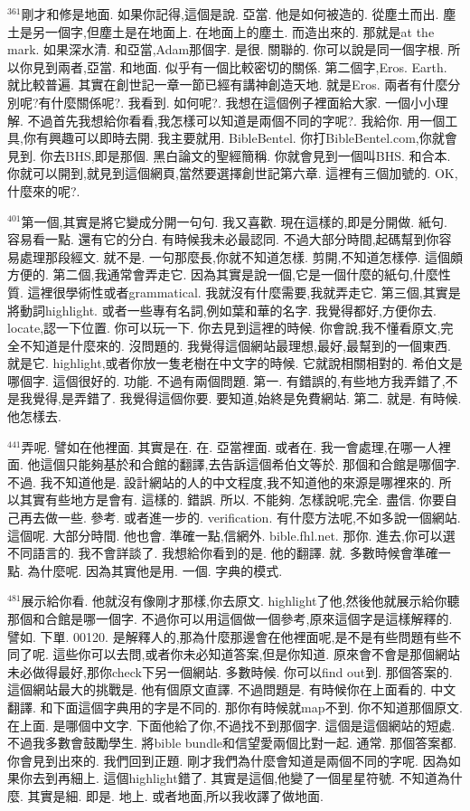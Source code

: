 \documentclass{book}
\begin{document}
$^{361}$剛才和修是地面.
如果你記得,這個是說.
亞當.
他是如何被造的.
從塵土而出.
塵土是另一個字,但塵土是在地面上.
在地面上的塵土.
而造出來的.
那就是at the mark.
如果深水清.
和亞當,Adam那個字.
是很.
關聯的.
你可以說是同一個字根.
所以你見到兩者,亞當.
和地面.
似乎有一個比較密切的關係.
第二個字,Eros.
Earth.
就比較普遍.
其實在創世記一章一節已經有講神創造天地.
就是Eros.
兩者有什麼分別呢?有什麼關係呢?.
我看到.
如何呢?.
我想在這個例子裡面給大家.
一個小小理解.
不過首先我想給你看看,我怎樣可以知道是兩個不同的字呢?.
我給你.
用一個工具,你有興趣可以即時去開.
我主要就用.
BibleBentel.
你打BibleBentel.com,你就會見到.
你去BHS,即是那個.
黑白論文的聖經簡稱.
你就會見到一個叫BHS.
和合本.
你就可以開到,就見到這個網頁,當然要選擇創世記第六章.
這裡有三個加號的.
OK,什麼來的呢?.

$^{401}$第一個,其實是將它變成分開一句句.
我又喜歡.
現在這樣的,即是分開做.
紙句.
容易看一點.
還有它的分白.
有時候我未必最認同.
不過大部分時間,起碼幫到你容易處理那段經文.
就不是.
一句那麼長,你就不知道怎樣.
剪開,不知道怎樣停.
這個頗方便的.
第二個,我通常會弄走它.
因為其實是說一個,它是一個什麼的紙句,什麼性質.
這裡很學術性或者grammatical.
我就沒有什麼需要,我就弄走它.
第三個,其實是將動詞highlight.
或者一些專有名詞,例如葉和華的名字.
我覺得都好,方便你去.
locate,認一下位置.
你可以玩一下.
你去見到這裡的時候.
你會說,我不懂看原文,完全不知道是什麼來的.
沒問題的.
我覺得這個網站最理想,最好,最幫到的一個東西.
就是它.
highlight,或者你放一隻老樹在中文字的時候.
它就說相關相對的.
希伯文是哪個字.
這個很好的.
功能.
不過有兩個問題.
第一.
有錯誤的,有些地方我弄錯了,不是我覺得,是弄錯了.
我覺得這個你要.
要知道,始終是免費網站.
第二.
就是.
有時候.
他怎樣去.

$^{441}$弄呢.
譬如在他裡面.
其實是在.
在.
亞當裡面.
或者在.
我一會處理,在哪一人裡面.
他這個只能夠基於和合館的翻譯,去告訴這個希伯文等於.
那個和合館是哪個字.
不過.
我不知道他是.
設計網站的人的中文程度,我不知道他的來源是哪裡來的.
所以其實有些地方是會有.
這樣的.
錯誤.
所以.
不能夠.
怎樣說呢,完全.
盡信.
你要自己再去做一些.
參考.
或者進一步的.
verification.
有什麼方法呢,不如多說一個網站.
這個呢.
大部分時間.
他也會.
準確一點,信網外.
bible.fhl.net.
那你.
進去,你可以選不同語言的.
我不會詳談了.
我想給你看到的是.
他的翻譯.
就.
多數時候會準確一點.
為什麼呢.
因為其實他是用.
一個.
字典的模式.

$^{481}$展示給你看.
他就沒有像剛才那樣,你去原文.
highlight了他,然後他就展示給你聽那個和合館是哪一個字.
不過你可以用這個做一個參考,原來這個字是這樣解釋的.
譬如.
下單.
00120.
是解釋人的,那為什麼那邊會在他裡面呢,是不是有些問題有些不同了呢.
這些你可以去問,或者你未必知道答案,但是你知道.
原來會不會是那個網站未必做得最好,那你check下另一個網站.
多數時候.
你可以find out到.
那個答案的.
這個網站最大的挑戰是.
他有個原文直譯.
不過問題是.
有時候你在上面看的.
中文翻譯.
和下面這個字典用的字是不同的.
那你有時候就map不到.
你不知道那個原文.
在上面.
是哪個中文字.
下面他給了你,不過找不到那個字.
這個是這個網站的短處.
不過我多數會鼓勵學生.
將bible bundle和信望愛兩個比對一起.
通常.
那個答案都.
你會見到出來的.
我們回到正題.
剛才我們為什麼會知道是兩個不同的字呢.
因為如果你去到再細上.
這個highlight錯了.
其實是這個,他變了一個星星符號.
不知道為什麼.
其實是細.
即是.
地上.
或者地面,所以我收譯了做地面.
\end{document}
